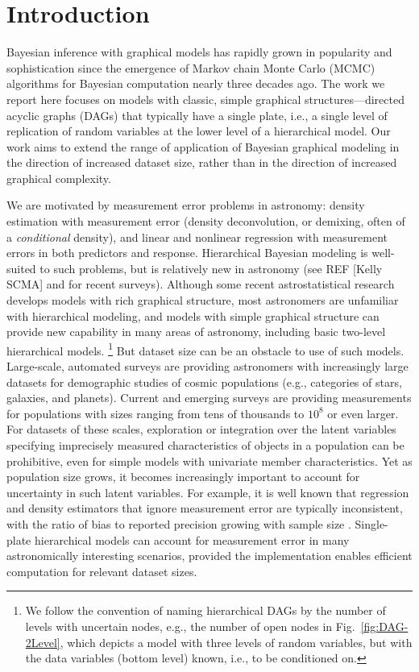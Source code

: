 \section{Introduction}
\label{sec:intro}

Bayesian inference with graphical models has rapidly grown in popularity and sophistication since the emergence of Markov chain Monte Carlo (MCMC) algorithms for Bayesian computation nearly three decades ago.
The work we report here focuses on models with classic, simple graphical structures---directed acyclic graphs (DAGs) that typically have a single plate, i.e., a single level of replication of random variables at the lower level of a hierarchical model.
Our work aims to extend the range of application of Bayesian graphical modeling in the direction of increased dataset size, rather than in the direction of increased graphical complexity.

We are motivated by measurement error problems in astronomy: density estimation with measurement error (density deconvolution, or demixing, often of a \emph{conditional} density), and linear and nonlinear regression with measurement errors in both predictors and response.
Hierarchical Bayesian modeling is well-suited to such problems, but is relatively new in astronomy (see REF [Kelly SCMA] and \citealt{loredo2013survey} for recent surveys).
Although some recent astrostatistical research develops models with rich graphical structure, most astronomers are unfamiliar with hierarchical modeling, and models with simple graphical structure can provide new capability in many areas of astronomy, including basic two-level hierarchical models.%
\footnote{We follow the convention of naming hierarchical DAGs by the number of levels with uncertain nodes, e.g., the number of open nodes in Fig.~\ref{fig:DAG-2Level}, which depicts a model with three levels of random variables, but with the data variables (bottom level) known, i.e., to be conditioned on.}
But dataset size can be an obstacle to use of such models.
Large-scale, automated surveys are providing astronomers with increasingly large datasets for demographic studies of cosmic populations (e.g., categories of stars, galaxies, and planets).
Current and emerging surveys are providing measurements for populations with sizes ranging from tens of thousands to $10^8$ or even larger.
For datasets of these scales, exploration or integration over the latent variables specifying imprecisely measured characteristics of objects in a population can be prohibitive, even for simple models with univariate member characteristics.
Yet as population size grows, it becomes increasingly important to account for uncertainty in such latent variables.
For example, it is well known that regression and density estimators that ignore measurement error are typically inconsistent, with the ratio of bias to reported precision growing with sample size \citep{C+06-MsmtErr}.
Single-plate hierarchical models can account for measurement error in many astronomically interesting scenarios, provided the implementation enables efficient computation for relevant dataset sizes.

